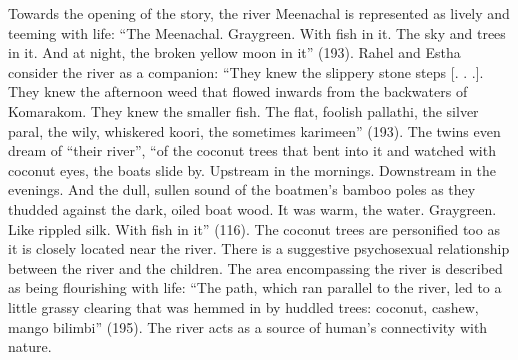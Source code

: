 Towards the opening of the story, the river Meenachal is represented as lively and teeming with life: “The Meenachal. Graygreen. With fish in it. The sky and trees in it. And at night, the broken yellow moon in it” (193). Rahel and Estha consider the river as a companion: “They knew the slippery stone steps [. . .]. They knew the afternoon weed that flowed inwards from the backwaters of Komarakom. They knew the smaller fish. The flat, foolish pallathi, the silver paral, the wily, whiskered koori, the sometimes karimeen” (193).  The twins even dream of “their river”, “of the coconut trees that bent into it and watched with coconut eyes, the boats slide by. Upstream in the mornings. Downstream in the evenings. And the dull, sullen sound of the boatmen’s bamboo poles as they thudded against the dark, oiled boat wood. It was warm, the water. Graygreen. Like rippled silk. With fish in it” (116).  The coconut trees are personified too as it is closely located near the river. There is a suggestive psychosexual relationship between the river and the children. The area encompassing the river is described as being flourishing with life: “The path, which ran parallel to the river, led to a little grassy clearing that was hemmed in by huddled trees: coconut, cashew, mango bilimbi” (195). The river acts as a source of human’s connectivity with nature.

